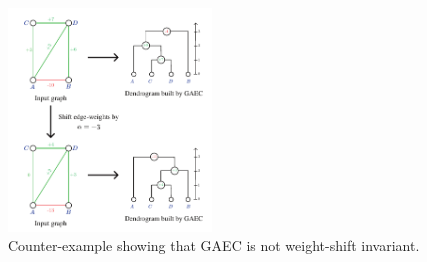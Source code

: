\begin{figure}[t]
\centering
\includegraphics[width=0.48\textwidth,trim=0in 0in 0in 0in,clip]{./figures/GASP/counter-examples/counter-example-GAEC.pdf}

        \caption{ Counter-example showing that GAEC is not weight-shift invariant.
        } \label{fig:counter_examples_shift_inv_GAEC}
\end{figure}
